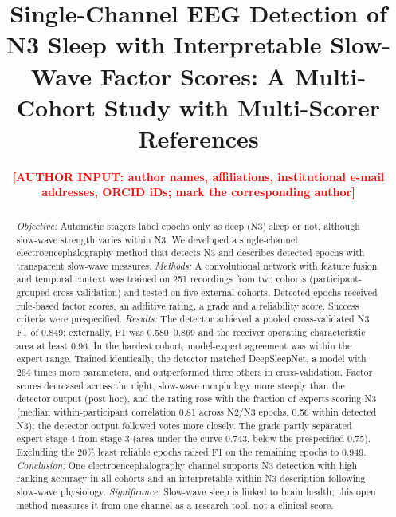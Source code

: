 \documentclass[journal]{IEEEtran}
\newcommand{\placeholder}[1]{\textbf{\textcolor{red}{[#1]}}}
\begin{document}
\title{Single-Channel EEG Detection of N3 Sleep with Interpretable Slow-Wave Factor Scores: A Multi-Cohort Study with Multi-Scorer References}

\author{\placeholder{AUTHOR INPUT: author names, affiliations, institutional e-mail addresses, ORCID iDs; mark the corresponding author}%
}


\maketitle

\begin{abstract}
\textit{Objective:} Automatic stagers label epochs only as deep (N3) sleep or not, although slow-wave strength varies within N3. We developed a single-channel electroencephalography method that detects N3 and describes detected epochs with transparent slow-wave measures. \textit{Methods:} A convolutional network with feature fusion and temporal context was trained on 251 recordings from two cohorts (participant-grouped cross-validation) and tested on five external cohorts. Detected epochs received rule-based factor scores, an additive rating, a grade and a reliability score. Success criteria were prespecified. \textit{Results:} The detector achieved a pooled cross-validated N3 F1 of 0.849; externally, F1 was 0.580--0.869 and the receiver operating characteristic area at least 0.96. In the hardest cohort, model-expert agreement was within the expert range. Trained identically, the detector matched DeepSleepNet, a model with 264 times more parameters, and outperformed three others in cross-validation. Factor scores decreased across the night, slow-wave morphology more steeply than the detector output (post hoc), and the rating rose with the fraction of experts scoring N3 (median within-participant correlation 0.81 across N2/N3 epochs, 0.56 within detected N3); the detector output followed votes more closely. The grade partly separated expert stage 4 from stage 3 (area under the curve 0.743, below the prespecified 0.75). Excluding the 20\% least reliable epochs raised F1 on the remaining epochs to 0.949. \textit{Conclusion:} One electroencephalography channel supports N3 detection with high ranking accuracy in all cohorts and an interpretable within-N3 description following slow-wave physiology. \textit{Significance:} Slow-wave sleep is linked to brain health; this open method measures it from one channel as a research tool, not a clinical score.
\end{abstract}
\end{document}
